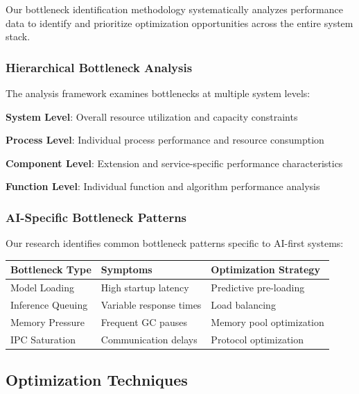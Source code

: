 Our bottleneck identification methodology systematically analyzes performance data to identify and prioritize optimization opportunities across the entire system stack.

\subsubsection*{Hierarchical Bottleneck Analysis}

The analysis framework examines bottlenecks at multiple system levels:

\begin{expandedlist}
    \item \textbf{System Level}: Overall resource utilization and capacity constraints
    \item \textbf{Process Level}: Individual process performance and resource consumption
    \item \textbf{Component Level}: Extension and service-specific performance characteristics
    \item \textbf{Function Level}: Individual function and algorithm performance analysis
\end{expandedlist}

\subsubsection*{AI-Specific Bottleneck Patterns}

Our research identifies common bottleneck patterns specific to AI-first systems:

\begin{center}
\begin{tabular}{@{}lll@{}}
\toprule
\textbf{Bottleneck Type} & \textbf{Symptoms} & \textbf{Optimization Strategy} \\
\midrule
Model Loading & High startup latency & Predictive pre-loading \\
Inference Queuing & Variable response times & Load balancing \\
Memory Pressure & Frequent GC pauses & Memory pool optimization \\
IPC Saturation & Communication delays & Protocol optimization \\
\bottomrule
\end{tabular}
\end{center}

\subsection*{Optimization Techniques}

